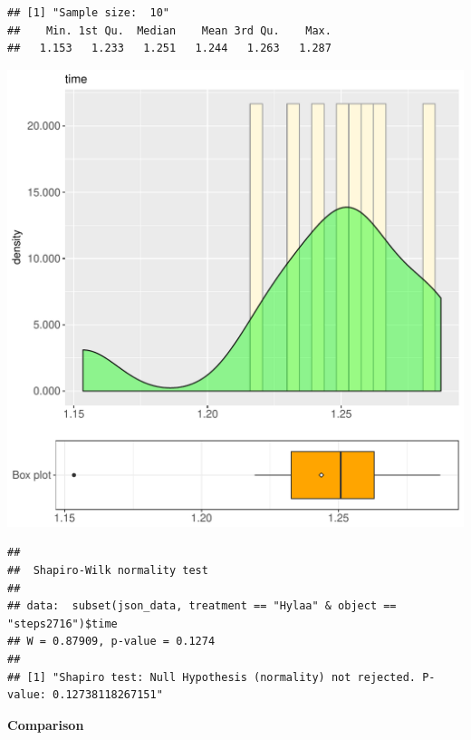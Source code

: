 \documentclass{article}\usepackage[]{graphicx}\usepackage[]{color}
\makeatletter
\def\maxwidth{ %
  \ifdim\Gin@nat@width>\linewidth
    \linewidth
  \else
    \Gin@nat@width
  \fi
}
\newenvironment{kframe}{%
 \def\at@end@of@kframe{}%
 \ifinner\ifhmode%
  \def\at@end@of@kframe{\end{minipage}}%
  \begin{minipage}{\columnwidth}%
 \fi\fi%
 \def\FrameCommand##1{\hskip\@totalleftmargin \hskip-\fboxsep
 \colorbox{shadecolor}{##1}\hskip-\fboxsep
     \hskip-\linewidth \hskip-\@totalleftmargin \hskip\columnwidth}%
 \MakeFramed {\advance\hsize-\width
   \@totalleftmargin\z@ \linewidth\hsize
   \@setminipage}}%
 {\par\unskip\endMakeFramed%
 \at@end@of@kframe}
\newenvironment{knitrout}{}{} %
\makeatother
\begin{document}
\begin{knitrout}
\color{fgcolor}\begin{kframe}
\begin{verbatim}
## [1] "Sample size:  10"
##    Min. 1st Qu.  Median    Mean 3rd Qu.    Max. 
##   1.153   1.233   1.251   1.244   1.263   1.287
\end{verbatim}
\end{kframe}
\includegraphics[width=\maxwidth]{figure/RH2_Hylaa_steps2716-1} 
\begin{kframe}\begin{verbatim}
## 
## 	Shapiro-Wilk normality test
## 
## data:  subset(json_data, treatment == "Hylaa" & object == "steps2716")$time
## W = 0.87909, p-value = 0.1274
## 
## [1] "Shapiro test: Null Hypothesis (normality) not rejected. P-value: 0.12738118267151"
\end{verbatim}
\end{kframe}
\end{knitrout}
  
 \textbf{Comparison}
  
\end{document}
